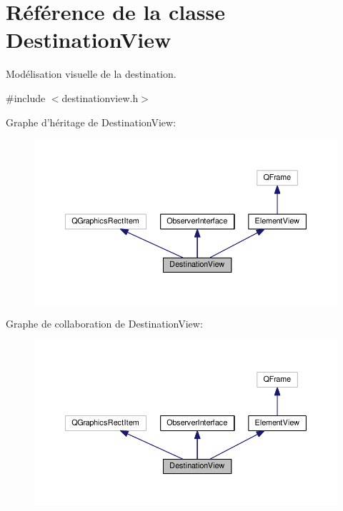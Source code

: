 \hypertarget{classDestinationView}{\section{Référence de la classe Destination\+View}
\label{classDestinationView}
}


Modélisation visuelle de la destination.  




{\ttfamily \#include $<$destinationview.\+h$>$}



Graphe d'héritage de Destination\+View\+:
\nopagebreak
\begin{figure}[H]
\begin{center}
\leavevmode
\includegraphics[width=350pt]{d6/d79/classDestinationView__inherit__graph}
\end{center}
\end{figure}


Graphe de collaboration de Destination\+View\+:
\nopagebreak
\begin{figure}[H]
\begin{center}
\leavevmode
\includegraphics[width=350pt]{d0/d46/classDestinationView__coll__graph}
\end{center}
\end{figure}
